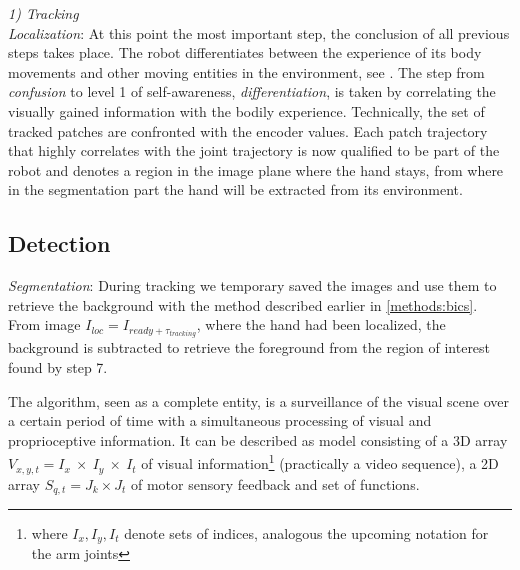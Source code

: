 \documentclass[conference]{IEEEtran}
\begin{document}
	
	
%
\textit{1) Tracking}\\ \newline
\textit{Localization}: At this point the most important step, the conclusion of all previous steps takes place. The 						robot differentiates between the experience of its body movements and other moving entities in the environment, see 				\cite{FLSAUEL03-02}. The step from \textit{confusion} to level 1 of self-awareness, \textit{differentiation}, is 							taken by correlating the visually gained information with the bodily experience. Technically, the set of tracked  						patches are confronted with the encoder values. Each patch trajectory that highly correlates with the joint 									trajectory is now qualified to be part of the robot and denotes a region in the image plane where the hand stays, from where in the segmentation part the hand will be extracted from its environment.
\\ \newline
%
%
%
%
\subsection{Detection}\label{method:detection}
\textit{Segmentation}: During tracking we temporary saved the images and use them to retrieve the background with the method described earlier in \ref{methods:bics}. From image $I_{loc}=I_{ready + \tau_{tracking}}$, where the hand had been localized, the background  is subtracted to retrieve the foreground from the region of interest found by step 7.

%
The algorithm, seen as a complete entity, is a surveillance of the visual scene over a certain period of time with a simultaneous processing of visual and proprioceptive information. It can be described as model consisting of a 3D array $V_{x,y,t}=I_x\ \times\ I_y\ \times\ I_t$ of visual information\footnote{where $I_x,I_y,I_t$ denote sets of indices, analogous the upcoming notation for the arm joints} (practically a video sequence), a 2D array $S_{q,t} = J_k \times J_t$ of motor sensory feedback and set of functions. 
\end{document}
